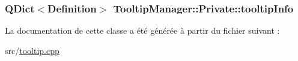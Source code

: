 \subsubsection[{tooltip\+Info}]{\setlength{\rightskip}{0pt plus 5cm}Q\+Dict$<${\bf Definition}$>$ Tooltip\+Manager\+::\+Private\+::tooltip\+Info}\label{class_tooltip_manager_1_1_private_a32f0f1faaa5aa0f53818e854ef87b8e1}


La documentation de cette classe a été générée à partir du fichier suivant \+:\begin{DoxyCompactItemize}
\item 
src/\hyperlink{tooltip_8cpp}{tooltip.\+cpp}\end{DoxyCompactItemize}
